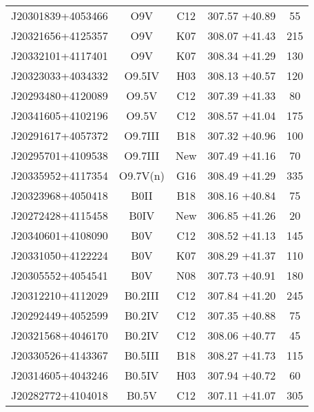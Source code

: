 \documentclass{aa} %
\begin{document}
\begin{appendix}
\begin{table*}[p!]
\begin{tabular}{lcccc}
\small{J20301839+4053466} & \small{O9V} & \small{C12}& \small{307.57 +40.89} & \small{55}\\	
\small{J20321656+4125357} & \small{O9V} & \small{K07} & \small{308.07 +41.43}& \small{215} \\
\small{J20332101+4117401} & \small{O9V} & \small{K07} & \small{308.34 +41.29}& \small{130} \\
\small{J20323033+4034332} & \small{O9.5IV} & \small{H03} & \small{308.13 +40.57} & \small{120}\\
\small{J20293480+4120089} & \small{O9.5V} & \small{C12} & \small{307.39 +41.33}  & \small{80}\\
\small{J20341605+4102196} & \small{O9.5V} & \small{C12}& \small{308.57 +41.04} & \small{175} \\		
\small{J20291617+4057372} & \small{O9.7III} & \small{B18}& \small{307.32 +40.96} & \small{100}\\
\small{J20295701+4109538} & \small{O9.7III} & \small{New}& \small{307.49 +41.16} & \small{70}\\	
\small{J20335952+4117354} & \small{O9.7V(n)} & \small{G16}& \small{308.49 +41.29} & \small{335}\\
\small{J20323968+4050418} & \small{B0II} & \small{B18} & \small{308.16 +40.84}& \small{75}\\
\small{J20272428+4115458} & \small{B0IV} & \small{New}& \small{306.85 +41.26} & \small{20} \\
\small{J20340601+4108090} & \small{B0V} & \small{C12}& \small{308.52 +41.13} & \small{145} \\		
\small{J20331050+4122224} & \small{B0V} & \small{K07} & \small{308.29 +41.37}& \small{110} \\	
\small{J20305552+4054541} & \small{B0V} & \small{N08}& \small{307.73 +40.91} & \small{180}\\
\small{J20312210+4112029} & \small{B0.2III} & \small{C12}& \small{307.84 +41.20}  & \small{245}\\
\small{J20292449+4052599} & \small{B0.2IV} & \small{C12}& \small{307.35 +40.88}  & \small{75}\\
\small{J20321568+4046170} & \small{B0.2IV} & \small{C12} & \small{308.06 +40.77} & \small{45}\\
\small{J20330526+4143367} & \small{B0.5III} & \small{B18}  &\small{308.27 +41.73}& \small{115}\\
\small{J20314605+4043246} & \small{B0.5IV} & \small{H03} & \small{307.94 +40.72} & \small{60}\\
\small{J20282772+4104018} & \small{B0.5V} & \small{C12}& \small{307.11 +41.07}   & \small{305}\\

\end{tabular}
\end{table*}
\end{appendix}
\end{document}
